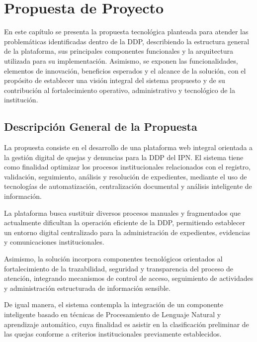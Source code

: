 
\chapter{Propuesta de Proyecto}
\label{cap:propuesta_proyecto}
\justifying

En este capítulo se presenta la propuesta tecnológica planteada para atender las problemáticas identificadas dentro de la DDP, describiendo la estructura general de la plataforma, sus principales componentes funcionales y la arquitectura utilizada para su implementación. Asimismo, se exponen las funcionalidades, elementos de innovación, beneficios esperados y el alcance de la solución, con el propósito de establecer una visión integral del sistema propuesto y de su contribución al fortalecimiento operativo, administrativo y tecnológico de la institución.

\section{Descripción General de la Propuesta}

La propuesta consiste en el desarrollo de una plataforma web integral orientada a la gestión digital de quejas y denuncias para la DDP del IPN. El sistema tiene como finalidad optimizar los procesos institucionales relacionados con el registro, validación, seguimiento, análisis y resolución de expedientes, mediante el uso de tecnologías de automatización, centralización documental y análisis inteligente de información.

La plataforma busca sustituir diversos procesos manuales y fragmentados que actualmente dificultan la operación eficiente de la DDP, permitiendo establecer un entorno digital centralizado para la administración de expedientes, evidencias y comunicaciones institucionales.

Asimismo, la solución incorpora componentes tecnológicos orientados al fortalecimiento de la trazabilidad, seguridad y transparencia del proceso de atención, integrando mecanismos de control de acceso, seguimiento de actividades y administración estructurada de información sensible.

De igual manera, el sistema contempla la integración de un componente inteligente basado en técnicas de Procesamiento de Lenguaje Natural y aprendizaje automático, cuya finalidad es asistir en la clasificación preliminar de las quejas conforme a criterios institucionales previamente establecidos.

